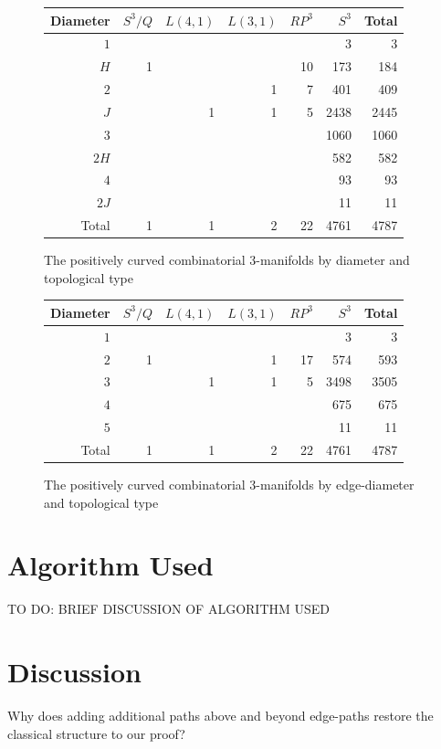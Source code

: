 \documentclass[12pt]{article}
\begin{document}
\begin{figure}
\centering
\begin{tabular} {| r | r | r | r | r | r | r |}
\hline
Diameter & $S^{3}/Q$ & $L(4,1)$ & $L(3,1)$ & $RP^{3}$ & $S^{3}$ & Total \\
\hline
\hline
$1$&  &  &  &   &3    & 3    \\
$H$&1 &  &  &10 &173  & 184  \\
$2$&  &  &1 &7  &401  & 409  \\
$J$&  &1 &1 &5  &2438 & 2445 \\
$3$&  &  &  &   &1060 & 1060 \\
$2H$&  &  &  &   &582  & 582  \\
$4$&  &  &  &   &93   & 93   \\
$2J$&  &  &  &   &11   & 11   \\
\hline
Total&1 &1 &2 &22   &4761   &4787  \\
\hline
\end{tabular}
\caption{The positively curved combinatorial 3-manifolds by diameter and topological type}
\label{fig:manifold_counts}
\end{figure}

\begin{figure}
\centering
\begin{tabular} {| r | r | r | r | r | r | r |}	
\hline
Diameter & $S^{3}/Q$ & $L(4,1)$ & $L(3,1)$ & $RP^{3}$ & $S^{3}$ & Total \\
\hline
\hline
$1$ &  &  &  &   &3    & 3    \\
$2$ & 1&  &1 &17 &574  & 593  \\
$3$ &  &1 &1 &5  &3498 & 3505 \\
$4$ &  &  &  &   &675  & 675   \\
$5$ &  &  &  &   &11   & 11   \\
\hline
Total&1 &1 &2 &22   &4761   &4787  \\
\hline
\end{tabular}
\caption{The positively curved combinatorial 3-manifolds by edge-diameter and topological type}
\label{fig:manifold_counts_edges}
\end{figure}

\section{Algorithm Used}

TO DO: BRIEF DISCUSSION OF ALGORITHM USED

\section{Discussion}
Why does adding additional paths above and beyond edge-paths restore the classical structure to our proof?
\end{document}
